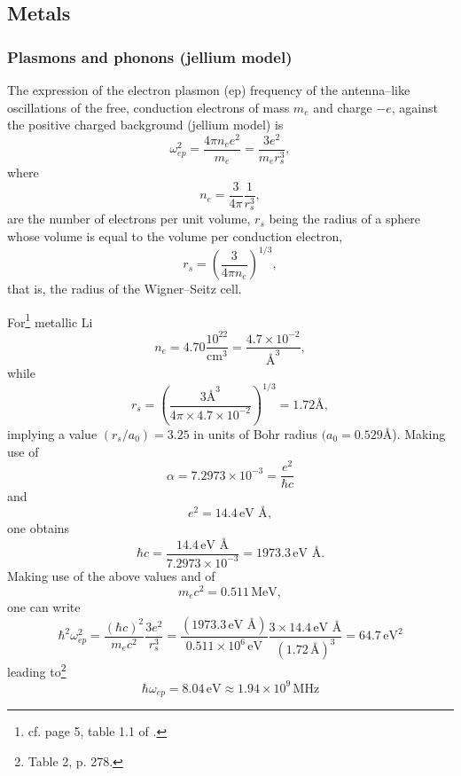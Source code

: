 \subsection{Metals}\label{App3A2}
\subsubsection{Plasmons and phonons (jellium model)}
The expression of the electron plasmon (ep) frequency of the antenna--like oscillations of the free, conduction electrons of mass $m_e$ and charge $-e$, against the positive charged background (jellium model) is
\begin{equation}\label{eq3.A.33}
\omega_{ep}^2=\frac{4\pi n_e e^2}{m_e}=\frac{3e^2}{m_er_s^3},
\end{equation}
where 
\begin{equation}
n_e=\frac{3}{4\pi}\frac{1}{r_s^3},
\end{equation}
are the number of electrons per unit volume, $r_s$ being the radius of a sphere whose volume is equal to the volume per conduction electron,
\begin{equation}
r_s=\left(\frac{3}{4\pi n_e}\right)^{1/3},
\end{equation}
that is, the radius of the Wigner--Seitz cell.


For\footnote{cf. page 5, table 1.1 of \cite{Ashcroft:87}.} metallic Li
\begin{equation}
n_e=4.70\frac{10^{22}}{\text{cm}^3}=\frac{4.7\times10^{-2}}{\text{\AA{}}^3},
\end{equation}
while
\begin{equation}
r_s=\left(\frac{3\text{\AA}^3}{4\pi\times4.7\times10^{-2}}\right)^{1/3}=1.72\text{\AA},
\end{equation}
implying a value $(r_s/a_0)=3.25$ in units of  Bohr radius $(a_0=0.529$\AA).
Making use of 
\begin{equation}
\alpha=7.2973\times10^{-3}=\frac{e^2}{\hbar c}
\end{equation}
and
\begin{equation}
e^2=14.4\,\text{eV \AA},
\end{equation}
one obtains
\begin{equation}
\hbar c=\frac{14.4\,\text{eV \AA}}{7.2973\times10^{-3}}=1973.3\,\text{eV \AA}.
\end{equation}
Making use of the above values and of
\begin{equation}
m_ec^2=0.511\,\text{MeV},
\end{equation}
one can write
\begin{equation}
\hbar^2\omega^2_{ep}=\frac{(\hbar c)^2}{m_e c^2}\frac{3e^2}{r_s^3}=\frac{(1973.3\,\text{eV \AA})}{0.511\times10^6\,\text{eV}}\frac{3\times14.4\,\text{eV \AA}}{(1.72\,\text{\AA})^3}=64.7\,\text{eV}^2
\end{equation}
leading to\footnote{\cite{Kittel:96} Table 2, p. 278.}
\begin{equation}
\hbar\omega_{ep}=8.04\,\text{eV}\approx 1.94\times 10^9\,\text{MHz}
\end{equation}


